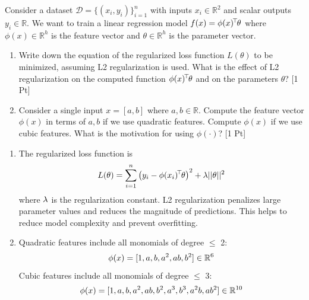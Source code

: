 

\renewcommand{\course}{Artificial Intelligence}
\renewcommand{\coursepicture}{course_ai}
\renewcommand{\coursedate}{Summer 2026}

\renewcommand{\exnum}{Exercise 2}
\renewcommand{\teacher}{Sayantan Auddy}
\exercises
\exercisestitle



Consider a dataset $\mathcal{D} = \{ (x_i, y_i) \}_{i=1}^n$ with inputs $x_i \in \mathbb{R}^2$ and scalar outputs $y_i \in \mathbb{R}$. We want to train a linear regression model $f(x) = \phi(x)^{\!\top\!}\theta$ where $\phi(x) \in \mathbb{R}^h$ is the feature vector and $\theta \in \mathbb{R}^h$ is the parameter vector. 

\begin{enumerate}
	\item Write down the equation of the regularized loss function $L(\theta)$ to be minimized, assuming L2 regularization is used. What is the effect of L2 regularization on the computed function $\phi(x)^{\!\top\!} \theta$ and on the parameters $\theta$? [1 Pt]
	\item Consider a single input $x = [a, b]$ where $a,b \in \mathbb{R}$. Compute the feature vector $\phi(x)$ in terms of $a,b$ if we use quadratic features. Compute $\phi(x)$ if we use cubic features. What is the motivation for using $\phi(\cdot)$? [1 Pt]
\end{enumerate}

\begin{solution}
\begin{enumerate}
	\item The regularized loss function is $$L(\theta) = \sum_{i=1}^{n} \left( y_i - \phi(x_i)^{\!\top\!}\theta\right)^2 + \lambda\vert\vert \theta \vert\vert^2$$ where $\lambda$ is the regularization constant.
	 L2 regularization penalizes large parameter values and reduces the magnitude of predictions. This helps to reduce model complexity and prevent overfitting.

 \item Quadratic features include all monomials of degree $\leq$ 2: $$\phi(x) = [ 1, a, b, a^2, ab, b^2] \in {\mathbb{R}}^6$$ 
	 Cubic features include all monomials of degree $\leq$ 3: $$\phi(x) = [ 1, a, b, a^2, ab, b^2, a^3, b^3, a^2b, ab^2] \in {\mathbb{R}}^{10}$$
\end{enumerate}
\end{solution}

